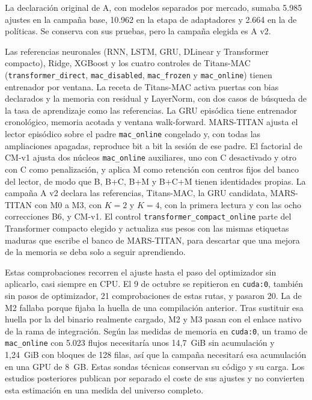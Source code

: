 \documentclass[11pt,a4paper]{report}
\begin{document}
La declaración original de A, con modelos separados por mercado, sumaba 5.985
ajustes en la campaña base, 10.962 en la etapa de adaptadores y 2.664 en la de
políticas. Se conserva con sus pruebas, pero la campaña elegida es A v2.

Las referencias neuronales (RNN, LSTM, GRU, DLinear y Transformer compacto),
Ridge, XGBoost y los cuatro controles de Titans-MAC
(\texttt{transformer\_direct}, \texttt{mac\_disabled}, \texttt{mac\_frozen} y
\texttt{mac\_online}) tienen entrenador por ventana. La receta de Titans-MAC
activa puertas con bias declarados y la memoria con residual y LayerNorm, con
dos casos de búsqueda de la tasa de aprendizaje como las referencias. La GRU
episódica tiene entrenador cronológico, memoria acotada y ventana
walk-forward. MARS-TITAN ajusta el lector episódico sobre el padre
\texttt{mac\_online} congelado y, con todas las ampliaciones apagadas,
reproduce bit a bit la sesión de ese padre. El factorial de CM-v1 ajusta dos
núcleos \texttt{mac\_online} auxiliares, uno con C desactivado y otro con C
como penalización, y aplica M como retención con centros fijos del banco del
lector, de modo que B, B+C, B+M y B+C+M tienen identidades propias. La
campaña A v2 declara las referencias, Titans-MAC, la GRU candidata,
MARS-TITAN con M0 a M3, con $K=2$ y $K=4$, con la primera lectura y con las
ocho correcciones B6, y CM-v1. El control
\texttt{transformer\_compact\_online} parte del Transformer compacto elegido y
actualiza sus pesos con las mismas etiquetas maduras que escribe el banco de
MARS-TITAN, para descartar que una mejora de la memoria se deba solo a seguir
aprendiendo.

Estas comprobaciones recorren el ajuste hasta el paso del optimizador sin
aplicarlo, casi siempre en CPU. El 9 de octubre se repitieron en
\texttt{cuda:0}, también sin pasos de optimizador, 21 comprobaciones de estas
rutas, y pasaron 20. La de M2 fallaba porque fijaba la huella de una
compilación anterior. Tras sustituir esa huella por la del binario realmente
cargado, M2 y M3 pasan con el enlace nativo de la rama de integración. Según
las medidas de memoria en \texttt{cuda:0}, un tramo de
\texttt{mac\_online} con 5.023 flujos necesitaría unos 14,7~GiB sin acumulación
y 1,24~GiB con bloques de 128 filas, así que la campaña necesitará esa
acumulación en una GPU de 8~GB. Estas sondas técnicas conservan su código y su
carga. Los estudios posteriores publican por separado el coste de sus ajustes
y no convierten esta estimación en una medida del universo completo.
\end{document}
